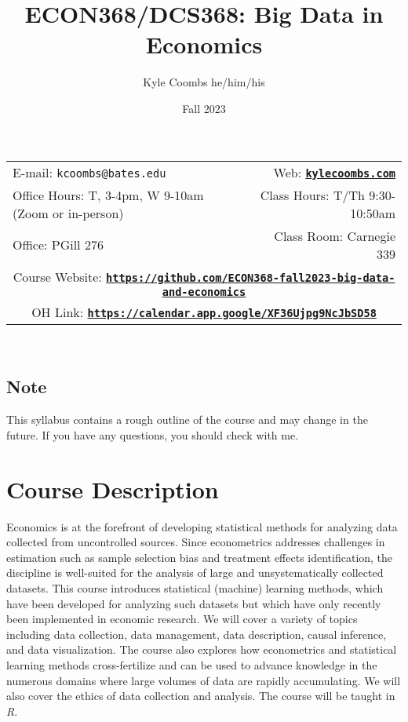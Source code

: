 \documentclass[11pt]{article}
\title{ECON368/DCS368: Big Data in Economics}
\author{Kyle Coombs he/him/his}
\date{Fall 2023}
\begin{document}
\maketitle

\begin{tabular*}{\textwidth}{@{\extracolsep{\fill}}lr}
  
E-mail: \texttt{kcoombs@bates.edu} & Web: \href{kylecoombs.com}{\tt\bf kylecoombs.com} \\

  Office Hours: T, 3-4pm, W 9-10am  (Zoom or in-person)  &  Class Hours: T/Th 9:30-10:50am \\
  Office: PGill 276 & Class Room: Carnegie 339 \\ 
  \multicolumn{2}{c}{Course Website: \href{https://github.com/ECON368-fall2023-big-data-and-economics}{\tt\bf https://github.com/ECON368-fall2023-big-data-and-economics}} \\
  \multicolumn{2}{c}{OH Link: \href{https://calendar.app.google/XF36Ujpg9NcJbSD58
  }{\tt\bf https://calendar.app.google/XF36Ujpg9NcJbSD58}} \\
\hline
\end{tabular*} \\
  

\subsection*{Note}
\label{sec:note}

This syllabus contains a rough outline of the course and may change in the future.  If you have any questions, you should check with me.

\section*{Course Description}
\label{sec:desc}

Economics is at the forefront of developing statistical methods for analyzing data collected from uncontrolled sources. Since econometrics addresses challenges in estimation such as sample selection bias and treatment effects identification, the discipline is well-suited for the analysis of large and unsystematically collected datasets. This course introduces statistical (machine) learning methods, which have been developed for analyzing such datasets but which have only recently been implemented in economic research. We will cover a variety of topics including data collection, data management, data description, causal inference, and data visualization.  The course also explores how econometrics and statistical learning methods cross-fertilize and can be used to advance knowledge in the numerous domains where large volumes of data are rapidly accumulating. We will also cover the ethics of data collection and analysis. The course will be taught in \textit{R}. 
\end{document}
